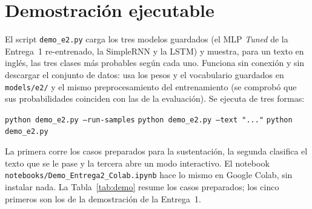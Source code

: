 \documentclass[12pt, a4paper]{article}
\begin{document}
\section{Demostración ejecutable}\label{sec:demo}

El script \texttt{demo\_e2.py} carga los tres modelos guardados (el MLP \textit{Tuned} de la Entrega~1 re-entrenado, la SimpleRNN y la LSTM) y muestra, para un texto en inglés, las tres clases más probables según cada uno. Funciona sin conexión y sin descargar el conjunto de datos: usa los pesos y el vocabulario guardados en \texttt{models/e2/} y el mismo preprocesamiento del entrenamiento (se comprobó que sus probabilidades coinciden con las de la evaluación). Se ejecuta de tres formas:
\begin{center}
\texttt{python demo\_e2.py --run-samples} \quad\textbar\quad \texttt{python demo\_e2.py --text "..."} \quad\textbar\quad \texttt{python demo\_e2.py}
\end{center}
La primera corre los casos preparados para la sustentación, la segunda clasifica el texto que se le pase y la tercera abre un modo interactivo. El notebook \nolinkurl{notebooks/Demo_Entrega2_Colab.ipynb} hace lo mismo en Google Colab, sin instalar nada. La Tabla~\ref{tab:demo} resume los casos preparados; los cinco primeros son los de la demostración de la Entrega~1.
\end{document}
